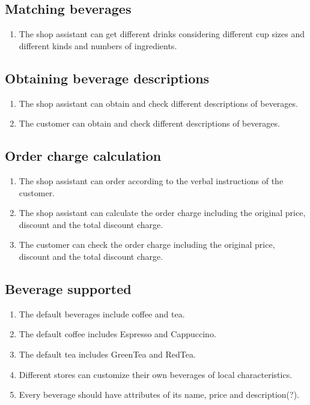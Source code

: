 \documentclass[a4paper]{report}
\begin{document}
\subsection{Matching beverages}

\begin{enumerate}
\item The shop assistant can get different drinks considering different cup sizes and different kinds and numbers of ingredients.
\end{enumerate}

\subsection{Obtaining beverage descriptions}
\begin{enumerate}
\item The shop assistant can obtain and check different descriptions of beverages.
\item The customer can obtain and check different descriptions of beverages.
\end{enumerate}

\subsection{Order charge calculation}
\begin{enumerate}
\item The shop assistant can order according to the verbal instructions of the customer.
\item The shop assistant can calculate the order charge including the original price, discount and the total discount charge.
\item The customer can check the order charge including the original price, discount and the total discount charge.
\end{enumerate}

\subsection{Beverage supported}
\begin{enumerate}
\item The default beverages include coffee and tea.
\item The default coffee includes Espresso and Cappuccino.
\item The default tea includes GreenTea and RedTea.
\item Different stores can customize their own beverages of local characteristics.
\item Every beverage should have attributes of its name, price and description(?).

\end{enumerate}
\end{document}

